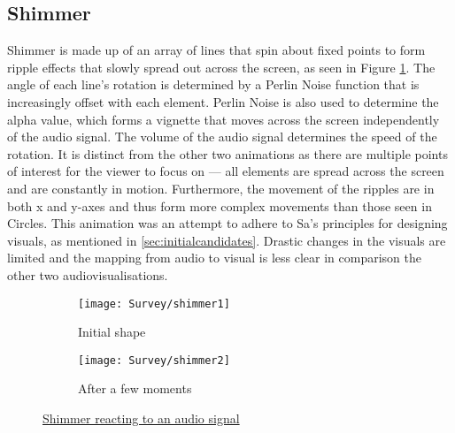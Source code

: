 \documentclass[../initial_thesis.tex]{subfiles}
\begin{document}
\subsection{Shimmer}
Shimmer is made up of an array of lines that spin about fixed points to form ripple effects that slowly spread out across the screen, as seen in Figure \ref{fig:shimmer1}. The angle of each line's rotation is determined by a Perlin Noise function that is increasingly offset with each element. Perlin Noise is also used to determine the alpha value, which forms a vignette that moves across the screen independently of the audio signal. The volume of the audio signal determines the speed of the rotation. It is distinct from the other two animations as there are multiple points of interest for the viewer to focus on --- all elements are spread across the screen and are constantly in motion. Furthermore, the movement of the ripples are in both x and y-axes and thus form more complex movements than those seen in Circles. This animation was an attempt to adhere to Sa's principles for designing visuals, as mentioned in \ref{sec:initialcandidates}. Drastic changes in the visuals are limited and the mapping from audio to visual is less clear in comparison the other two audiovisualisations.

\begin{figure}
  \begin{subfigure}{0.5\textwidth}
    \texttt{[image: Survey/shimmer1]}
    \caption{Initial shape}
  \end{subfigure} 
  \begin{subfigure}{0.5\textwidth}
    \texttt{[image: Survey/shimmer2]}
    \caption{After a few moments}
  \end{subfigure}
  \caption{\href{https://youtu.be/40OoNjl2jPE}{Shimmer reacting to an audio signal}}
  \label{fig:shimmer1}
\end{figure}
\end{document}

